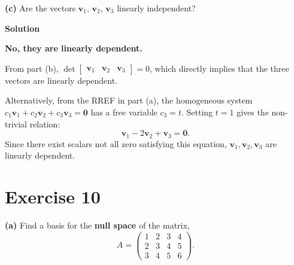 \documentclass[12pt,a4paper]{article}
\begin{document}
\Needspace{4cm}
\textbf{(c)} Are the vectors $\mathbf{v}_1$, $\mathbf{v}_2$, $\mathbf{v}_3$
linearly independent?

\textbf{Solution}

\textbf{No, they are linearly dependent.}

From part (b), $\det \begin{bmatrix} \mathbf{v}_1 & \mathbf{v}_2 & \mathbf{v}_3 \end{bmatrix} = 0$, which directly implies that the three vectors are linearly dependent. 

Alternatively, from the RREF in part (a), the homogeneous system $c_1\mathbf{v}_1 + c_2\mathbf{v}_2 + c_3\mathbf{v}_3 = \mathbf{0}$ has a free variable $c_3 = t$. Setting $t = 1$ gives the non-trivial relation:
\[
\mathbf{v}_1 - 2\mathbf{v}_2 + \mathbf{v}_3 = \mathbf{0}.
\]
Since there exist scalars not all zero satisfying this equation, $\mathbf{v}_1, \mathbf{v}_2, \mathbf{v}_3$ are linearly dependent.

\section*{Exercise 10}
\textbf{(a)} Find a basis for the \textbf{null space} of the matrix,
\[
A=\begin{pmatrix}
	1 & 2 & 3 & 4\\
	2 & 3 & 4 & 5\\
	3 & 4 & 5 & 6
\end{pmatrix}.
\]
\end{document}

